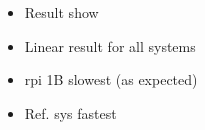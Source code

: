 \begin{itemize}
    \item Result show
    \item Linear result for all systems
    \item rpi 1B slowest (as expected)
    \item Ref. sys fastest
\end{itemize}